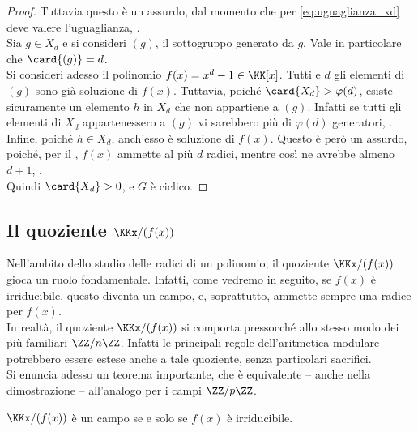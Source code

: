 \begin{proof}
    \vskip 0.1in

    Tuttavia questo è un assurdo, dal momento che per \eqref{eq:uguaglianza_xd}
    deve valere l'uguaglianza, \Lightning{}. \\

    Sia $g \in X_d$ e si consideri $(g)$, il sottogruppo generato da $g$.
    Vale in particolare che $\card{(g)} = d$. \\

    Si consideri adesso il polinomio $f(x)= x^d-1 \in \KK[x]$. Tutti e $d$ gli
    elementi di $(g)$ sono già soluzione di $f(x)$. Tuttavia, poiché
    $\card{X_d} > \varphi(d)$, esiste sicuramente un elemento $h$ in $X_d$ che
    non appartiene a $(g)$. Infatti se tutti gli elementi di $X_d$ appartenessero
    a $(g)$ vi sarebbero più di $\varphi(d)$ generatori, \Lightning{}. \\

    Infine, poiché $h \in X_d$, anch'esso è soluzione di $f(x)$. Questo è
    però un assurdo, poiché, per il , $f(x)$
    ammette al più $d$ radici, mentre così ne avrebbe almeno $d+1$, \Lightning{}. \\

    Quindi $\card{X_d}>0$, e $G$ è ciclico.
\end{proof}

\subsection{Il quoziente \texorpdfstring{$\KKx/(f(x))$}{K[x]/(f(x))}}

Nell'ambito dello studio delle radici di un polinomio,
il quoziente $\KKx/(f(x))$ gioca un ruolo fondamentale.
Infatti, come vedremo in seguito, se $f(x)$ è irriducibile,
questo diventa un campo, e, soprattutto, ammette sempre una
radice per $f(x)$. \\

In realtà, il quoziente $\KKx/(f(x))$ si comporta pressocché
allo stesso modo dei più familiari $\ZZ/n\ZZ$. Infatti
le principali regole dell'aritmetica modulare potrebbero
essere estese anche a tale quoziente, senza particolari
sacrifici. \\

Si enuncia adesso un teorema importante, che è equivalente --
anche nella dimostrazione -- all'analogo per i campi
$\ZZ/p\ZZ$.

\begin{theorem}
    \label{th:campo_quoziente_irriducibile}
    $\KKx/(f(x))$ è un campo se e solo se $f(x)$ è irriducibile.
\end{theorem}

